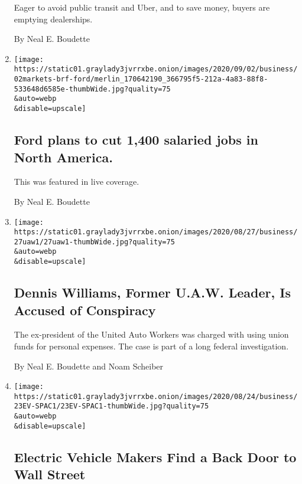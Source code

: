 \begin{enumerate}
  Eager to avoid public transit and Uber, and to save money, buyers are
  emptying dealerships.

  By Neal E. Boudette
\item
  \href{/live/2020/09/02/business/stock-market-today-coronavirus/ford-plans-to-cut-1400-salaried-jobs-in-north-america}{}

  \texttt{[image: https://static01.graylady3jvrrxbe.onion/images/2020/09/02/business/02markets-brf-ford/merlin\_170642190\_366795f5-212a-4a83-88f8-533648d6585e-thumbWide.jpg?quality=75\\\&auto=webp\\\&disable=upscale]}

  \hypertarget{ford-plans-to-cut-1400-salaried-jobs-in-north-america}{%
  \subsection{Ford plans to cut 1,400 salaried jobs in North
  America.}\label{ford-plans-to-cut-1400-salaried-jobs-in-north-america}}

  This was featured in live coverage.

  By Neal E. Boudette
\item
  \href{/2020/08/27/business/uaw-dennis-williams.html}{}

  \texttt{[image: https://static01.graylady3jvrrxbe.onion/images/2020/08/27/business/27uaw1/27uaw1-thumbWide.jpg?quality=75\\\&auto=webp\\\&disable=upscale]}

  \hypertarget{dennis-williams-former-uaw-leader-is-accused-of-conspiracy}{%
  \subsection{Dennis Williams, Former U.A.W. Leader, Is Accused of
  Conspiracy}\label{dennis-williams-former-uaw-leader-is-accused-of-conspiracy}}

  The ex-president of the United Auto Workers was charged with using
  union funds for personal expenses. The case is part of a long federal
  investigation.

  By Neal E. Boudette and Noam Scheiber
\item
  \href{/2020/08/23/business/electric-cars-spac-wall-street.html}{}

  \texttt{[image: https://static01.graylady3jvrrxbe.onion/images/2020/08/24/business/23EV-SPAC1/23EV-SPAC1-thumbWide.jpg?quality=75\\\&auto=webp\\\&disable=upscale]}

  \hypertarget{electric-vehicle-makers-find-a-back-door-to-wall-street}{%
  \subsection{Electric Vehicle Makers Find a Back Door to Wall
  Street}\label{electric-vehicle-makers-find-a-back-door-to-wall-street}}


\end{enumerate}
